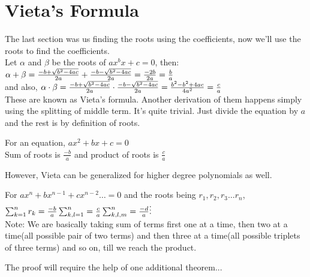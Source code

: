 \section{Vieta's Formula}
The last section was us finding the roots using the coefficients, now we'll use the roots to find the coefficients.\\
Let $\alpha$ and $\beta$ be the roots of $ax^bx+c=0$, then:\\
$\alpha + \beta \\
= \frac{-b + \sqrt{b^2-4ac}}{2a}+\frac{-b - \sqrt{b^2-4ac}}{2a}\\
=\frac{-2b}{2a}\\
=\frac{b}{a}$\\
and also, $\alpha \cdot \beta\\
= \frac{-b + \sqrt{b^2-4ac}}{2a} \cdot \frac{-b - \sqrt{b^2-4ac}}{2a}\\
=\frac{b^2-b^2+4ac}{4a^2}\\
=\frac{c}{a}$\\
These are known as Vieta's formula. Another derivation of them happens simply using the splitting of middle term. It's quite trivial. Just divide the equation by $a$ and the rest is by definition of roots.
\begin{theorem}
    For an equation, $ax^2+bx+c=0$ \\
    Sum of roots is $\frac{-b}{a}$ and product of roots is $\frac{c}{a}$ 
\end{theorem}
However, Vieta can be generalized for higher degree polynomials as well.
\begin{theorem}
    For $ax^n+bx^{n-1}+cx^{n-2}\dots=0$ and the roots being $r_1, r_2, r_3 \dots r_n$,\\
    $\sum^n_{k=1}r_k=\frac{-b}{a}\\
    \sum^n_{k,l=1}=\frac{c}{a}\\
    \sum^n_{k,l,m}=\frac{-d}{a}\\
    \vdots$\\
    Note: We are basically taking sum of terms first one at a time, then two at a time(all possible pair of two terms) and then three at a time(all possible triplets of three terms) and so on, till we reach the product.
\end{theorem}
The proof will require the help of one additional theorem...
